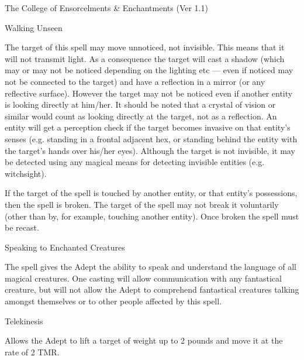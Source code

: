 \begin{Chapter}{The College of Ensorcelments \& Enchantments (Ver 1.1)}
\begin{spell}[G-4]{Walking Unseen }

\begin{effects}
The target of this spell may move unnoticed, not invisible.  This
means that it will not transmit light. As a consequence the target
will cast a shadow (which may or may not be noticed depending on the
lighting etc — even if noticed may not be connected to the target) and
have a reflection in a mirror (or any reflective surface).  However
the target may not be noticed even if another entity is looking
directly at him/her.  It should be noted that a crystal of vision or
similar would count as looking directly at the target, not as a
reflection.  An entity will get a perception check if the target
becomes invasive on that entity’s senses (e.g. standing in a frontal
adjacent hex, or standing behind the entity with the target’s hands
over his/her eyes). Although the target is not invisible, it may be
detected using any magical means for detecting invisible entities
(e.g. witchsight).

If the target of the spell is touched by another entity, or that
entity’s possessions, then the spell is broken.  The target of the
spell may not break it voluntarily (other than by, for example,
touching another entity).  Once broken the spell must be recast.
\end{effects}
\end{spell}

\begin{spell}[G-5]{Speaking to Enchanted Creatures }

\begin{effects}
The spell gives the Adept the ability to speak and understand the
language of all magical creatures.  One casting will allow
communication with any fantastical creature, but will not allow the
Adept to comprehend fantastical creatures talking amongst themselves
or to other people affected by this spell.
\end{effects}
\end{spell}

\begin{spell}[G-2]{Telekinesis }
\begin{effects}
Allows the Adept to lift a target of weight up to 2 pounds and move it
at the rate of 2 TMR.
\end{effects}
\end{spell}


\end{Chapter}
